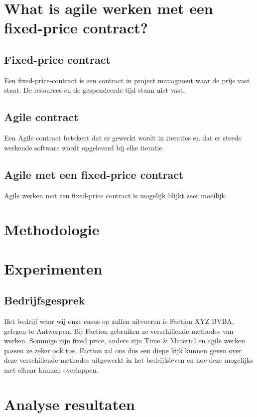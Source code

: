 \documentclass{hogent-article}
\begin{document}
    \section{What is agile werken met een fixed-price contract?}
    \subsection{Fixed-price contract}
     Een fixed-price-contract is een contract in project managment waar de prijs vast staat. De resources en de gespendeerde tijd staan niet vast.
     \subsection{Agile contract}
     Een Agile contract betekent dat er gewerkt wordt in iteraties en dat er steeds werkende software wordt opgeleverd bij elke iteratie.  
    
    \subsection{Agile met een fixed-price contract}
    Agile werken met een fixed-price contract is mogelijk blijkt zeer moeilijk.
	\section{Methodologie}
	\section{Experimenten}
    \subsection{Bedrijfsgesprek}
    Het bedrijf waar wij onze casus op zullen uitvoeren is Faction XYZ BVBA, gelegen te Antwerpen. Bij Faction gebruiken ze verschillende methodes van werken. Sommige zijn fixed price, andere zijn Time \& Material en agile werken passen ze zeker ook toe. Faction zal ons dus een diepe kijk kunnen geven over deze verschillende methodes uitgewerkt in het bedrijfsleven en hoe deze mogelijks met elkaar kunnen overlappen.
	\section{Analyse resultaten}
	
\end{document}
